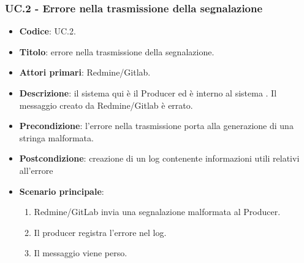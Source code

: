\subsubsection{UC\theuccount.2 - Errore nella trasmissione della segnalazione}
	\begin{itemize}
		\item \textbf{Codice}: UC\theuccount.2.
		\item \textbf{Titolo}: errore nella trasmissione della segnalazione.
		\item \textbf{Attori primari}: Redmine/Gitlab.
		\item \textbf{Descrizione}: il sistema qui è il Producer ed è interno al sistema \progetto. Il messaggio creato da Redmine/Gitlab è errato.
		\item \textbf{Precondizione}: l'errore nella trasmissione porta alla generazione di una stringa malformata.
		\item \textbf{Postcondizione}: creazione di un log contenente informazioni utili relativi all'errore
		\item \textbf{Scenario principale}:
		\begin{enumerate}
			\item Redmine/GitLab invia una segnalazione malformata al Producer.
			\item Il producer registra l'errore nel log.
			\item Il messaggio viene perso.
		\end{enumerate}
	\end{itemize}

